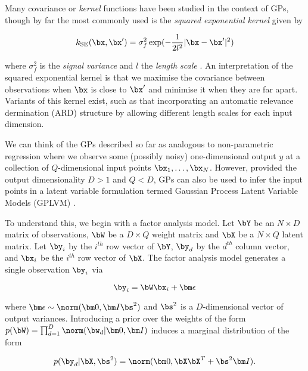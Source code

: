 Many covariance or \emph{kernel} functions have been studied in the context of GPs, though by far the most commonly used is the \emph{squared exponential kernel} given by

 \begin{equation}
 	k_{\text{SE}}(\bx, \bx') = \sigma_f^2 \exp(-\frac{1}{2l^2}|\bx - \bx'|^2)
 \end{equation}

 where $\sigma_f^2$ is the \emph{signal variance} and $l$ the \emph{length scale} \cite{rasmussen2006gaussian}. An interpretation of the squared exponential kernel is that we maximise the covariance between observations when $\bx$ is close to $\bx'$ and minimise it when they are far apart. Variants of this kernel exist, such as that incorporating an automatic relevance dermination (ARD) structure by allowing different length scales for each input dimension.

 We can think of the GPs described so far as analogous to non-parametric regression where we observe some (possibly noisy) one-dimensional output $y$ at a collection of $Q$-dimensional input points $\bx_1, \ldots, \bx_N$. However, provided the output dimensionality $D > 1$ and $Q < D$, GPs can also be used to infer the input points in a latent variable formulation termed Gaussian Process Latent Variable Models (GPLVM) \cite{lawrence2005probabilistic}.

 To understand this, we begin with a factor analysis model. Let $\bY$ be an $N \times D$ matrix of observations, $\bW$ be a $D \times Q$ weight matrix and $\bX$ be a $N \times Q$ latent matrix. Let $\by_i$ by the $i^{th}$ row vector of $\bY$, $\by_d$ by the $d^{th}$ column vector, and $\bx_i$ be the $i^{th}$ row vector of $\bX$. The factor analysis model generates a single observation $\by_i$ via

 \begin{equation}
 	\by_i = \bW \bx_i + {\bm\epsilon}
 \end{equation}

 where ${\bm \epsilon} \sim \norm({\bm 0}, {\bm I} \bs^2)$ and $\bs^2$ is a $D$-dimensional vector of output variances. Introducing a prior over the weights of the form $p(\bW) = \prod_{d=1}^D \norm(\bw_d| {\bm 0}, {\bm I})$ induces a marginal distribution of the form

 \begin{equation}
 	p(\by_d | \bX, \bs^2) = \norm({\bm 0}, \bX \bX^T + \bs^2 {\bm I}).
 \end{equation}

